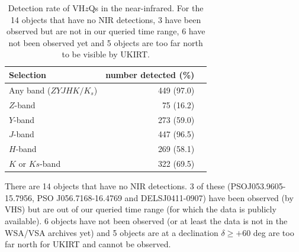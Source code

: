 \documentclass[usenatbib]{mnras}
\begin{document}
\begin{table}
  \centering
  \begin{tabular}{l r l}
    \hline  \hline
    Selection   & number detected (\%) \\
    \hline  
    Any band ($ZYJHK/K_{s}$)    &  449  (97.0) \\
    $Z$-band                            &  75  (16.2) \\
    $Y$-band                            &  273  (59.0) \\
    $J$-band                              &  447  (96.5) \\
    $H$-band                            &  269  (58.1) \\
    $K$ or $Ks$-band                &  322  (69.5) \\
    \hline  \hline
  \end{tabular}
  \caption{Detection rate of VH$z$Qs in the near-infrared. 
For the 14 objects that have no NIR detections, 3 have 
been observed but are not in our queried time range, 6 have 
not been observed yet and 5 objects are too far north to be visible 
by UKIRT. }
  \label{tab:nir_detection}
\end{table}

There are 14 objects that have no NIR detections.  3 of these
(PSOJ053.9605-15.7956, PSO J056.7168-16.4769 and DELSJ0411-0907) have
been observed (by VHS) but are out of our queried time range 
(for which the data is publicly available). 6 objects have not been 
observed (or at least the data is not in the
WSA/VSA archives yet) and 5 objects are at a declination $\delta \geq +60$
deg are too far north for UKIRT and cannot be observed.
\end{document}
